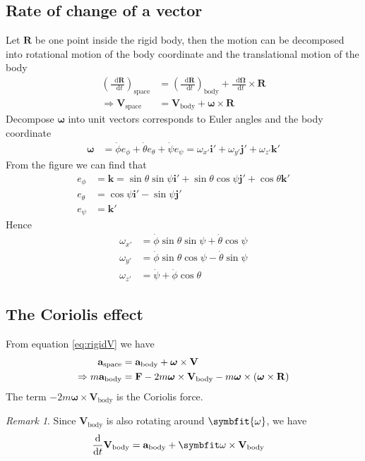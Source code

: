 \documentclass[twoside,9pt]{article}
\numberwithin{equation}{section} %
\renewcommand*\d{\mathop{}\!\mathrm{d}}
\theoremstyle{definition}
\theoremstyle{remark}
\newtheorem*{remark}{Remark}
\begin{document}
\subsection{Rate of change of a vector}
Let $\mathbf{R}$ be one point inside the rigid body, then
the motion can be decomposed into rotational motion of the
body coordinate and the translational motion of the body
\begin{align}
    \left(\frac{\d\mathbf{R}}{\d t}\right)_\text{space}
    &= \left(\frac{\d\mathbf{R}}{\d t}\right)_\text{body}
    + \frac{\d\boldsymbol{\Omega}}{\d t}\times\mathbf{R}\\
    \Rightarrow
    \mathbf{V}_\text{space} &= \mathbf{V}_\text{body}
    + \boldsymbol{\omega}\times\mathbf{R}
    \label{eq:rigidV}
\end{align}
Decompose $\boldsymbol{\omega}$ into unit vectors corresponds
to Euler angles and the body coordinate
\begin{align}
    \boldsymbol{\omega} &= 
    \dot\phi e_\phi + \dot\theta e_\theta + \dot\psi e_\psi
    = \omega_{x'}\mathbf{i}' + \omega_{y'}\mathbf{j}'
    + \omega_{z'}\mathbf{k}'
\end{align}
From the figure we can find that
\begin{align}
    e_\phi &= \mathbf{k}
    = \sin\theta\sin\psi\mathbf{i}' + \sin\theta\cos\psi\mathbf{j}'
    + \cos\theta\mathbf{k}'\\
    e_\theta &= \cos\psi\mathbf{i}' - \sin\psi\mathbf{j}'\\
    e_\psi &= \mathbf{k}'
\end{align}
Hence
\begin{align}
    \omega_{x'} &= \dot\phi\sin\theta\sin\psi + \dot\theta\cos\psi\\
    \omega_{y'} &= \dot\phi\sin\theta\cos\psi - \dot\theta\sin\psi\\
    \omega_{z'} &= \dot\psi + \dot\phi\cos\theta
\end{align}

\subsection{The Coriolis effect}
From equation \ref{eq:rigidV} we have
\begin{align}
    \mathbf{a}_\text{space} &=
    \mathbf{a}_\text{body}  + \boldsymbol{\omega}\times\mathbf{V}_\text{\space}\\
    \Rightarrow
    m\mathbf{a}_\text{body} &= 
    \mathbf{F} - 2m\boldsymbol{\omega}\times\mathbf{V}_\text{body}
    - m\boldsymbol{\omega}\times(\boldsymbol{\omega}\times\mathbf{R})
\end{align}
The term $-2m\boldsymbol{\omega}\times\mathbf{V}_\text{body}$
is the Coriolis force.
\begin{remark}
Since $\mathbf V_\text{body}$ is also rotating around $\symbfit{\omega}$,
we have
\begin{align}
    \frac{\d}{\d t}\mathbf V_\text{body}
    &= \mathbf a_\text{body} + \symbfit\omega\times\mathbf V_\text{body}
\end{align}

\end{remark}
\end{document}

